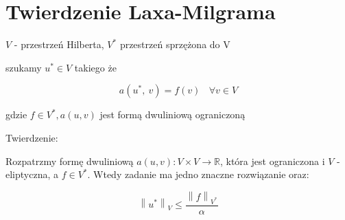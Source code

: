 \section{Twierdzenie Laxa-Milgrama}

$V$ - przestrzeń Hilberta, $V^*$ przestrzeń sprzężona do V

szukamy $u^* \in V$ takiego że

\[a(u^*,\ v) = f(v)\ \ \ \ \forall v \in V\]

gdzie $f \in V^*, a(u,v)$ jest formą dwuliniową ograniczoną

Twierdzenie:

Rozpatrzmy formę dwuliniową $a(u, v): V \times V \rightarrow \mathbb{R}$, która jest ograniczona i $V$ -eliptyczna, a $f \in V^*$. Wtedy zadanie ma jedno znaczne rozwiązanie oraz:

\[ \left \| u^* \right \|_V \leqslant \frac{\left \| f \right \|_{V^*}} {\alpha} \]